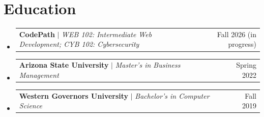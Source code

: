 \documentclass[letterpaper,11pt]{article}
\makeatletter
\newcommand{\resumeProjectHeading}[2]{
    \item
    \begin{tabular*}{0.97\textwidth}{l@{\extracolsep{\fill}}r}
      \small#1 & #2 \\
    \end{tabular*}\vspace{-7pt}
}
\newcommand{\resumeSubHeadingListStart}{\begin{itemize}[leftmargin=0.15in, label={}]}
\newcommand{\resumeSubHeadingListEnd}{\end{itemize}}
\makeatother
\begin{document}
\section{Education}
  \resumeSubHeadingListStart
    \resumeProjectHeading{\textbf{CodePath} $|$ \emph{WEB 102: Intermediate Web Development; CYB 102: Cybersecurity}}{Fall 2026 (in progress)}
    \resumeProjectHeading{\textbf{Arizona State University} $|$ \emph{Master's in Business Management}}{Spring 2022}
    \resumeProjectHeading{\textbf{Western Governors University} $|$ \emph{Bachelor's in Computer Science}}{Fall 2019}
  \resumeSubHeadingListEnd

\end{document}

